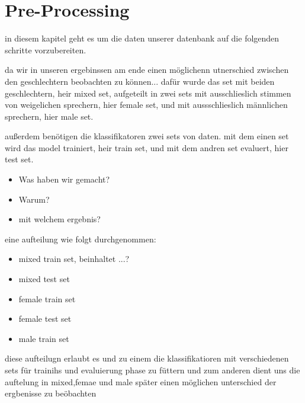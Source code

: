 \section{Pre-Processing}
\label{pre}

in diesem kapitel geht es um die daten unserer datenbank auf die folgenden schritte vorzubereiten.

da wir in unseren ergebinssen am ende einen möglichenn utnerschied zwischen den geschlechtern beobachten zu können...
dafür wurde das set mit beiden geschlechtern, heir mixed set, aufgeteilt in zwei sets mit ausschlieslich stimmen von weigelichen sprechern, hier female set, und mit aussschlieslich männlichen sprechern, hier male set.


außerdem benötigen die klassifikatoren zwei sets von daten.
mit dem einen set wird das model trainiert, heir train set, und mit dem andren set evaluert, hier test set.

\begin{itemize}
    \item Was haben wir gemacht?
    \item Warum?
    \item mit welchem ergebnis?
\end{itemize}



eine aufteilung wie folgt durchgenommen:
\begin{itemize}
    \item mixed train set, beinhaltet ...?
    \item mixed test set
    \item female train set
    \item female test set
    \item male train set
\end{itemize}

diese aufteilugn erlaubt es und zu einem die klassifikatioren mit verschiedenen sets für trainihs und evaluierung phase zu füttern und zum anderen dient uns die auftelung in mixed,femae und male später einen möglichen unterschied der ergbenisse zu beöbachten

